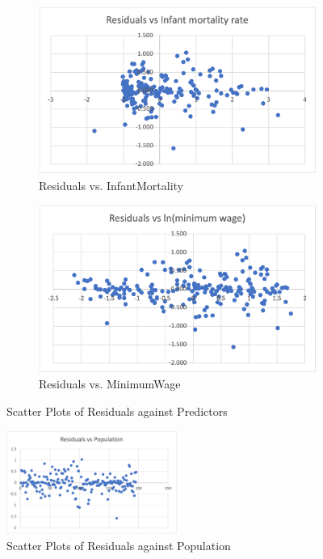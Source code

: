 \documentclass{article}
\begin{document}
\begin{appendices}
\begin{figure}[H]
     \centering
     \begin{subfigure}[b]{0.475\textwidth}
         \centering
         \includegraphics[width=\textwidth]{Images/resinf.png}
         \caption{Residuals vs. InfantMortality}
         \label{fig:resinf}
     \end{subfigure}
     \hfill
     \begin{subfigure}[b]{0.475\textwidth}
         \centering
         \includegraphics[width=\textwidth]{Images/resminwage.png}
         \caption{Residuals vs. MinimumWage}
         \label{fig:resminwage}
     \end{subfigure}
    \caption{Scatter Plots of Residuals against Predictors}
    \label{fig:scatterresid2}
\end{figure}

\begin{figure}[H]
    \centering
    \includegraphics[width=0.5\textwidth]{Images/respop.png}
    \caption{Scatter Plots of Residuals against Population}
    \label{fig:scatterresid3}
\end{figure}


\end{appendices}
\end{document}
